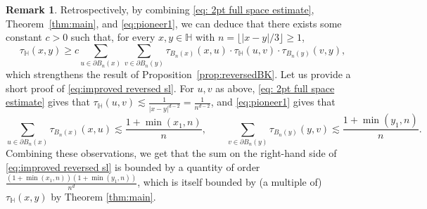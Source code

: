 \documentclass[11pt,a4paper]{article}
\numberwithin{equation}{section}
\theoremstyle{plain}
\theoremstyle{definition}
\newtheorem{Rem}[Thm]{Remark}
\begin{document}
\begin{Rem}\label{rem:rem}
Retrospectively, by combining \eqref{eq: 2pt full space estimate}, Theorem~\ref{thm:main}, and \eqref{eq:pioneer1}, we can deduce that there exists some constant $c>0$ such that, for every $x,y\in \mathbb H$ with $n=\lfloor |x-y|/3\rfloor\geq 1$, 
\begin{equation}\label{eq:improved reversed sl}
\tau_{\mathbb H}(x,y) \ge c \sum_{ u\in \partial B_n(x)} \sum_{v\in \partial B_n(y)} \tau_{B_n(x)}(x,u) \cdot \tau_{\mathbb H}(u,v) \cdot \tau_{B_n(y)}(v,y),
\end{equation}
which strengthens the result of Proposition~\ref{prop:reversedBK}. Let us provide a short proof of \eqref{eq:improved reversed sl}. For $u,v$ as above, \eqref{eq: 2pt full space estimate} gives that $\tau_{\mathbb H}(u,v)\lesssim \frac{1}{|x-y|^{d-2}}=\frac{1}{n^{d-2}}$, and \eqref{eq:pioneer1} gives that
\begin{equation}
	\sum_{u\in \partial B_n(x)}\tau_{B_n(x)}(x,u)\lesssim \frac{1+\min(x_1,n)}{n}, \qquad \sum_{v\in \partial B_n(y)}\tau_{B_n(y)}(y,v)\lesssim \frac{1+\min(y_1,n)}{n}.
\end{equation}
Combining these observations, we get that the sum on the right-hand side of \eqref{eq:improved reversed sl} is bounded by a quantity of order $\frac{(1+\min(x_1,n))(1+\min(y_1,n))}{n^d}$, which is itself bounded by (a multiple of) $\tau_{\mathbb H}(x,y)$ by Theorem \ref{thm:main}.
 
\end{Rem} 
\end{document}
